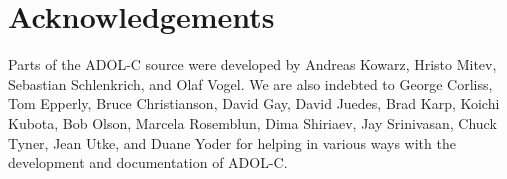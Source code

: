\documentclass[11pt,twoside]{article}
\begin{document}
\section*{Acknowledgements}
%
Parts of the ADOL-C source were developed by Andreas
Kowarz, Hristo Mitev, Sebastian Schlenkrich,  and Olaf
Vogel. We are also indebted to George Corliss, 
Tom Epperly, Bruce Christianson, David Gay,  David Juedes,
Brad Karp, Koichi Kubota, Bob Olson,  Marcela Rosemblun, Dima
Shiriaev, Jay Srinivasan, Chuck Tyner, Jean Utke, and Duane Yoder for helping in
various ways with the development and documentation of ADOL-C. 

\printbibliography
\end{document}
